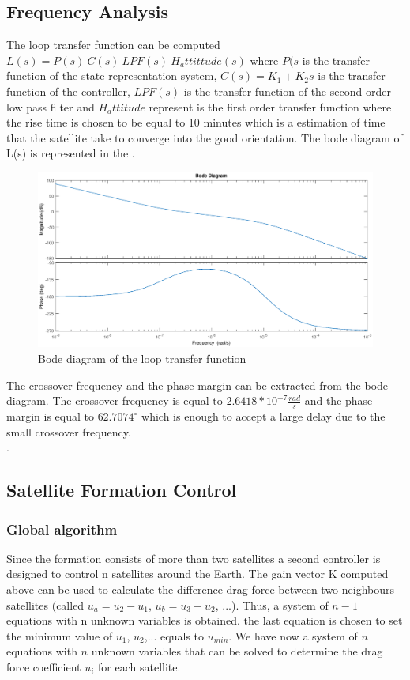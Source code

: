  \subsection{Frequency Analysis}
The loop transfer function can be computed $L(s) = P(s) \ C(s) \ LPF(s) \ H_attittude(s)$ where $P(s$ is the transfer function of the state representation system, $C(s) = K_1 + K_2 s$ is the transfer function of the controller, $LPF(s)$ is the transfer function of the second order low pass filter and $H_attitude$ represent is the first order transfer function where the rise time is chosen to be equal to 10 minutes which is a estimation of time that the satellite take to converge into the good orientation.
The bode diagram of L(s) is represented in the . \\
\begin{figure}[H]
	\centering
	\includegraphics[width=0.9\linewidth]
	{figures/Bode_L.eps}
	\caption{Bode diagram of the loop transfer function}
	\label{fig:Bode_L}
\end{figure}
The crossover frequency and the phase margin can be extracted from the bode diagram. The crossover frequency is equal to $2.6418*10^{-7}\frac{rad}{s}$ and the phase margin is equal to $62.7074^{\circ}$ which is enough to accept a large delay due to the small crossover frequency. \\.
 
\subsection{Satellite Formation Control} 
\subsubsection{Global algorithm}
Since the formation consists of more than two satellites a second controller is designed to control n satellites around the Earth. The gain vector K computed above can be used to calculate the difference drag force between two neighbours satellites (called $u_a = u_2 - u_1$, $u_b = u_3 - u_2$, ...). Thus, a system of $n-1$ equations with n unknown variables is obtained. the last equation is chosen to set the minimum value of $u_1$, $u_2$,... equals to $u_{min}$. We have now a system of $n$ equations with $n$ unknown variables that can be solved to determine the drag force coefficient $u_i$ for each satellite.

